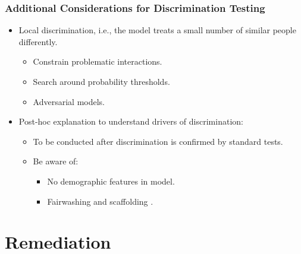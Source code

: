 \documentclass[11pt,aspectratio=169,hyperref={colorlinks}]{beamer}
\begin{document}
		\begin{frame}				
	
			\frametitle{Additional Considerations for Discrimination Testing}
	
			\begin{itemize}
				
				\item Local discrimination, i.e., the model treats a small number of similar people differently. 
				
				\begin{itemize}
					\item Constrain problematic interactions.
					\item Search around probability thresholds.
					\item Adversarial models.
				\end{itemize}
			
				\item Post-hoc explanation to understand drivers of discrimination:
				\begin{itemize}
					
					\item To be conducted after discrimination is confirmed by standard tests.
					
					\item Be aware of: 
					\begin{itemize}
						\item No demographic features in model.
						\item Fairwashing \cite{fair_washing} and scaffolding \cite{scaffolding}. 
					\end{itemize}
				
				\end{itemize}
	
			\end{itemize}
	
		\end{frame}
	

	\section{Remediation}
	
		\subsection*{}
\end{document}
